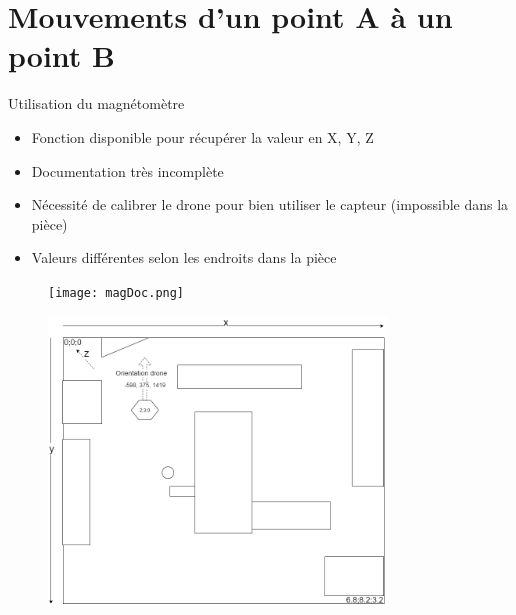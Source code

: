 \documentclass[12pt]{beamer}
\begin{document}
	\section{Mouvements d'un point A à un point B}
	\begin{frame}[allowframebreaks]
    	    
    	     \begin{block}{Utilisation du magnétomètre}
    	        \begin{itemize}
    	            [triangle]
    	            \item Fonction disponible pour récupérer la valeur en X, Y, Z
    	            \item Documentation très incomplète
    	            \item Nécessité de calibrer le drone pour bien utiliser le capteur (impossible dans la pièce)
    	            \item Valeurs différentes selon les endroits dans la pièce
    	        \end{itemize}
    	    \end{block}
    	    
    	    \begin{figure}
			    \centering
			    \texttt{[image: magDoc.png]}
			\end{figure}
    	    
    	    \begin{figure}
			    \centering
			    \includegraphics[width=0.8\textwidth]{calibrationMagnetoNord.png}
			\end{figure}
			

\end{frame}
\end{document}
